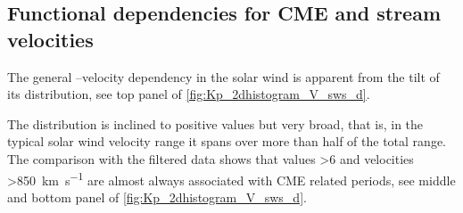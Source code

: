 \subsection{Functional dependencies for CME and stream velocities}
The general \Kp--velocity dependency in the solar wind is apparent from the tilt of its distribution, see top panel of \autoref{fig:Kp_2dhistogram_V_sws_d}.
\begin{figure}
\end{figure}
The distribution is inclined to positive values but very broad, that is, in the typical solar wind velocity range it spans over more than half of the total \Kp{} range. The comparison with the filtered data shows that \Kp{} values \num{>6} and velocities \SI{>850}{\km\per\s} are almost always associated with CME related periods, see middle and bottom panel of \autoref{fig:Kp_2dhistogram_V_sws_d}.

